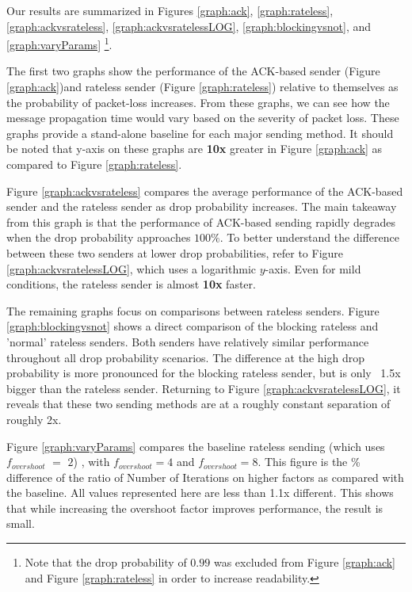 Our results are summarized in Figures \ref{graph:ack}, \ref{graph:rateless}, \ref{graph:ackvsrateless}, \ref{graph:ackvsratelessLOG}, \ref{graph:blockingvsnot}, and \ref{graph:varyParams} \footnote{Note that the drop probability of $0.99$ was excluded from Figure \ref{graph:ack} and Figure \ref{graph:rateless} in order to increase readability.}.

The first two graphs show the performance of the ACK-based sender (Figure \ref{graph:ack})and rateless sender (Figure \ref{graph:rateless}) relative to themselves as the probability of packet-loss increases. From these graphs, we can see how the message propagation time would vary based on the severity of packet loss. These graphs provide a stand-alone baseline for each major sending method. It should be noted that y-axis on these graphs are \textbf{10x} greater in Figure \ref{graph:ack} as compared to Figure \ref{graph:rateless}.

Figure \ref{graph:ackvsrateless} compares the average performance of the ACK-based sender and the rateless sender as drop probability increases. The main takeaway from this graph is that the performance of ACK-based sending rapidly degrades when the drop probability approaches $100\%$. To better understand the difference between these two senders at lower drop probabilities, refer to Figure \ref{graph:ackvsratelessLOG}, which uses a logarithmic $y$-axis. Even for mild conditions, the rateless sender is almost \textbf{10x} faster. 

The remaining graphs focus on comparisons between rateless senders. Figure \ref{graph:blockingvsnot} shows a direct comparison of the blocking rateless and 'normal' rateless senders. Both senders have relatively similar performance throughout all drop probability scenarios. The difference at the high drop probability is more pronounced for the blocking rateless sender, but is only ~1.5x bigger than the rateless sender. Returning to Figure \ref{graph:ackvsratelessLOG}, it reveals that these two sending methods are at a roughly constant separation of roughly 2x.

Figure \ref{graph:varyParams} compares the baseline rateless sending (which uses $f_{overshoot}$ $=$ $2$) , with $f_{overshoot} = 4$ and $f_{overshoot} = 8$. This figure is the \% difference of the ratio of Number of Iterations on higher factors as compared with the baseline. All values represented here are less than 1.1x different. This shows that while increasing the overshoot factor improves performance, the result is small.

